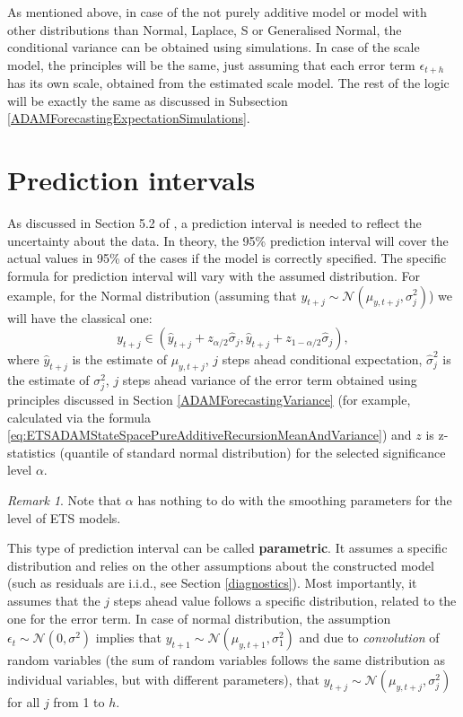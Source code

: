 \documentclass[]{book}
\theoremstyle{definition}
\theoremstyle{definition}
\theoremstyle{definition}
\theoremstyle{definition}
\theoremstyle{remark}
\newtheorem*{remark}{Remark}
\begin{document}
As mentioned above, in case of the not purely additive model or model with other distributions than Normal, Laplace, S or Generalised Normal, the conditional variance can be obtained using simulations. In case of the scale model, the principles will be the same, just assuming that each error term \(\epsilon_{t+h}\) has its own scale, obtained from the estimated scale model. The rest of the logic will be exactly the same as discussed in Subsection \ref{ADAMForecastingExpectationSimulations}.

\hypertarget{ADAMForecastingPI}{%
\section{Prediction intervals}\label{ADAMForecastingPI}}

As discussed in Section 5.2 of \citet{SvetunkovSBA}, a prediction interval is needed to reflect the uncertainty about the data. In theory, the 95\% prediction interval will cover the actual values in 95\% of the cases if the model is correctly specified. The specific formula for prediction interval will vary with the assumed distribution. For example, for the Normal distribution (assuming that \(y_{t+j} \sim \mathcal{N}(\mu_{y, t+j}, \sigma_j^2)\)) we will have the classical one:
\begin{equation}
    y_{t+j} \in (\hat{y}_{t+j} + z_{\alpha/2} \hat{\sigma}_j, \hat{y}_{t+j} + z_{1-\alpha/2} \hat{\sigma}_j),
    \label{eq:predictionInterval}
\end{equation}
where \(\hat{y}_{t+j}\) is the estimate of \(\mu_{y,t+j}\), \(j\) steps ahead conditional expectation, \(\hat{\sigma}_j^2\) is the estimate of \({\sigma}_j^2\), \(j\) steps ahead variance of the error term obtained using principles discussed in Section \ref{ADAMForecastingVariance} (for example, calculated via the formula \eqref{eq:ETSADAMStateSpacePureAdditiveRecursionMeanAndVariance}) and \(z\) is z-statistics (quantile of standard normal distribution) for the selected significance level \(\alpha\).

\begin{remark}
Note that \(\alpha\) has nothing to do with the smoothing parameters for the level of ETS models.
\end{remark}

This type of prediction interval can be called \textbf{parametric}. It assumes a specific distribution and relies on the other assumptions about the constructed model (such as residuals are i.i.d., see Section \ref{diagnostics}). Most importantly, it assumes that the \(j\) steps ahead value follows a specific distribution, related to the one for the error term. In case of normal distribution, the assumption \(\epsilon_t\sim\mathcal{N}(0,\sigma^2)\) implies that \(y_{t+1}\sim\mathcal{N}(\mu_{y,t+1}, \sigma_1^2)\) and due to \emph{convolution} of random variables (the sum of random variables follows the same distribution as individual variables, but with different parameters), that \(y_{t+j}\sim\mathcal{N}(\mu_{y,t+j},\sigma_j^2)\) for all \(j\) from 1 to \(h\).
\end{document}
